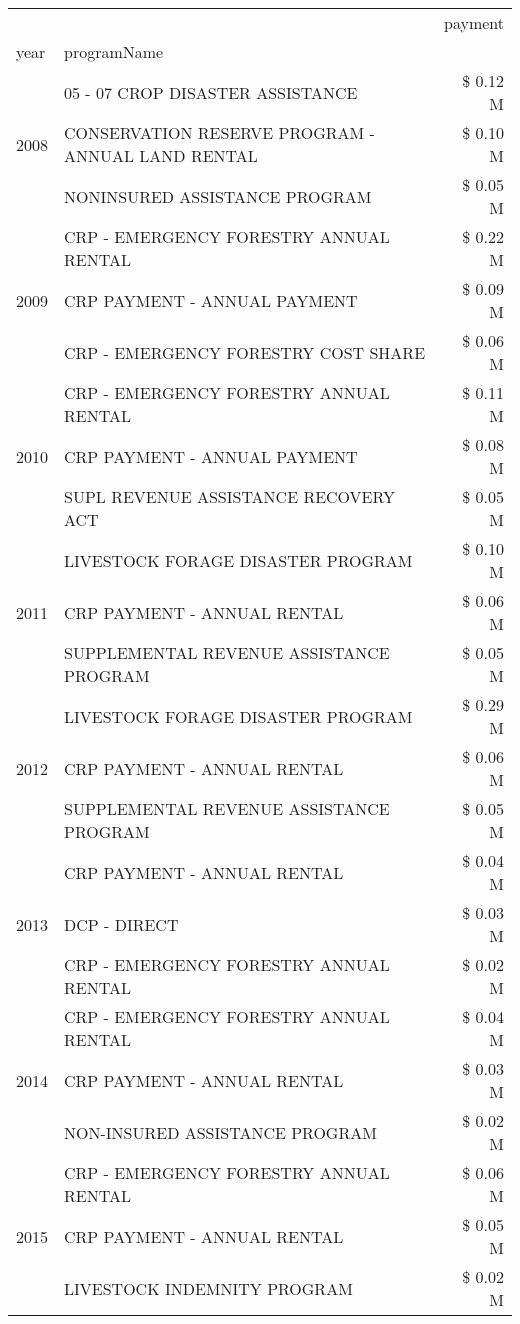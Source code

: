 \begin{tabular}{llr}
\toprule
 &  & payment \\
year & programName &  \\
\midrule
\multirow[t]{3}{*}{2008} & 05 - 07 CROP DISASTER ASSISTANCE & \$ 0.12 M \\
 & CONSERVATION RESERVE PROGRAM - ANNUAL LAND RENTAL & \$ 0.10 M \\
 & NONINSURED ASSISTANCE PROGRAM & \$ 0.05 M \\
\cline{1-3}
\multirow[t]{3}{*}{2009} & CRP - EMERGENCY FORESTRY ANNUAL RENTAL & \$ 0.22 M \\
 & CRP PAYMENT - ANNUAL PAYMENT & \$ 0.09 M \\
 & CRP - EMERGENCY FORESTRY COST SHARE & \$ 0.06 M \\
\cline{1-3}
\multirow[t]{3}{*}{2010} & CRP - EMERGENCY FORESTRY ANNUAL RENTAL & \$ 0.11 M \\
 & CRP PAYMENT - ANNUAL PAYMENT & \$ 0.08 M \\
 & SUPL REVENUE ASSISTANCE RECOVERY ACT & \$ 0.05 M \\
\cline{1-3}
\multirow[t]{3}{*}{2011} & LIVESTOCK FORAGE DISASTER PROGRAM & \$ 0.10 M \\
 & CRP PAYMENT - ANNUAL RENTAL & \$ 0.06 M \\
 & SUPPLEMENTAL REVENUE ASSISTANCE PROGRAM & \$ 0.05 M \\
\cline{1-3}
\multirow[t]{3}{*}{2012} & LIVESTOCK FORAGE DISASTER PROGRAM & \$ 0.29 M \\
 & CRP PAYMENT - ANNUAL RENTAL & \$ 0.06 M \\
 & SUPPLEMENTAL REVENUE ASSISTANCE PROGRAM & \$ 0.05 M \\
\cline{1-3}
\multirow[t]{3}{*}{2013} & CRP PAYMENT - ANNUAL RENTAL & \$ 0.04 M \\
 & DCP - DIRECT & \$ 0.03 M \\
 & CRP - EMERGENCY FORESTRY ANNUAL RENTAL & \$ 0.02 M \\
\cline{1-3}
\multirow[t]{3}{*}{2014} & CRP - EMERGENCY FORESTRY ANNUAL RENTAL & \$ 0.04 M \\
 & CRP PAYMENT - ANNUAL RENTAL & \$ 0.03 M \\
 & NON-INSURED ASSISTANCE PROGRAM & \$ 0.02 M \\
\cline{1-3}
\multirow[t]{3}{*}{2015} & CRP - EMERGENCY FORESTRY ANNUAL RENTAL & \$ 0.06 M \\
 & CRP PAYMENT - ANNUAL RENTAL & \$ 0.05 M \\
 & LIVESTOCK INDEMNITY PROGRAM & \$ 0.02 M \\

\end{tabular}
